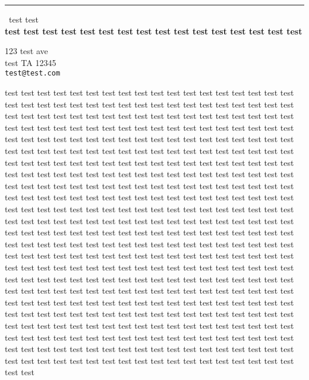 \documentclass{report}
\begin{document}
\begin{center}
\rule{6in}{1pt} \
{\large test test \\
{\bf test test test test test test test test test test test test test test test test }}

123 test ave \\ test TA 12345
\\
{\tt test@test.com}\end{center}

test test test test test test test test test test test test test test
test test test test test test test test test test test test test test
test test test test test test test test test test test test test test
test test test test test test test test test test test test test test
test test test test test test test test test test test test test test
test test test test test test test test test test test test test test
test test test test test test test test test test test test test test
test test test test test test test test test test test test test test
test test test test test test test test test test test test test test
test test test test test test test test test test test test test test
test test test test test test test test test test test test test test
test test test test test test test test test test test test test test
test test test test test test test test test test test test test test
test test test test test test test test test test test test test test
test test test test test test test test test test test test test test
test test test test test test test test test test test test test test
test test test test test test test test test test test test test test
test test test test test test test test test test test test test test
test test test test test test test test test test test test test test
test test test test test test test test test test test test test test
test test test test test test test test test test test test test test
test test test test test test test test test test test test test test
test test test test test test test test test test test test test test
test test test test test test test test test test test test test test
test test test test test test test test test test test test test test
test test test test test test test test test test test test test test
test test test test test test test test test test test test test test
test test test test test test test test test test test test test test
test test test test test test test test test test test test test test
test test test test test test test test test test test test test test
test test test test test test test test test test test test test test
\end{document}

